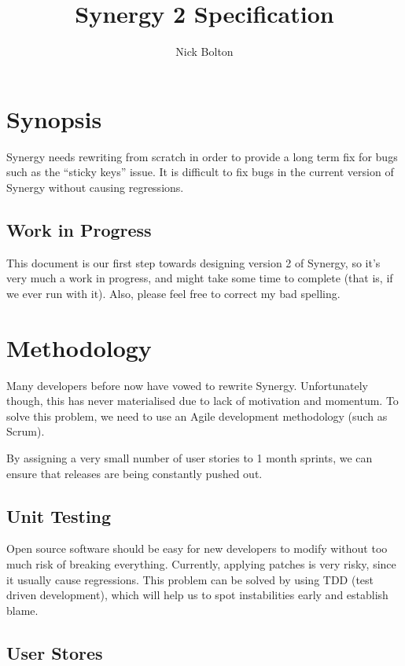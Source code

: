\documentclass{article}
\title{Synergy 2 Specification}
\author{Nick Bolton}
\begin{document}
\maketitle

\section{Synopsis}

Synergy needs rewriting from scratch in order to provide a long term fix for 
bugs such as the ``sticky keys'' issue. It is difficult to fix bugs in the
current version of Synergy without causing regressions.

\subsection{Work in Progress}

This document is our first step towards designing version 2 of Synergy, so it's
very much a work in progress, and might take some time to complete (that is, 
if we ever run with it). Also, please feel free to correct my bad spelling. 

\section{Methodology}

Many developers before now have vowed to rewrite Synergy. Unfortunately though,
this has never materialised due to lack of motivation and momentum. To solve 
this problem, we need to use an Agile development methodology (such as Scrum).

By assigning a very small number of user stories to 1 month sprints, we can
ensure that releases are being constantly pushed out.

\subsection{Unit Testing}

Open source software should be easy for new developers to modify without too
much risk of breaking everything. Currently, applying patches is very risky, 
since it usually cause regressions. This problem can be solved by using TDD 
(test driven development), which will help us to spot instabilities early and
establish blame.

\subsection{User Stores}
\end{document}
